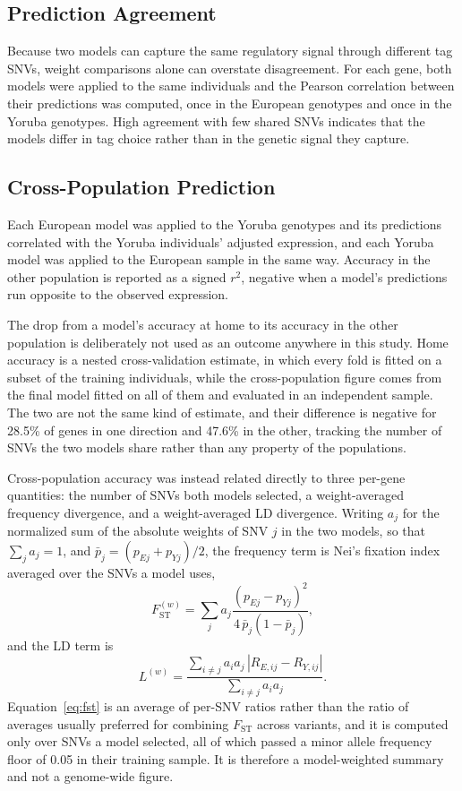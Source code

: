 \documentclass[conference]{IEEEtran}
\begin{document}
\subsection{Prediction Agreement}
Because two models can capture the same regulatory signal through different tag SNVs, weight comparisons alone can overstate disagreement. For each gene, both models were applied to the same individuals and the Pearson correlation between their predictions was computed, once in the European genotypes and once in the Yoruba genotypes. High agreement with few shared SNVs indicates that the models differ in tag choice rather than in the genetic signal they capture.

\subsection{Cross-Population Prediction}
Each European model was applied to the Yoruba genotypes and its predictions correlated with the Yoruba individuals' adjusted expression, and each Yoruba model was applied to the European sample in the same way. Accuracy in the other population is reported as a signed $r^2$, negative when a model's predictions run opposite to the observed expression.

The drop from a model's accuracy at home to its accuracy in the other population is deliberately not used as an outcome anywhere in this study. Home accuracy is a nested cross-validation estimate, in which every fold is fitted on a subset of the training individuals, while the cross-population figure comes from the final model fitted on all of them and evaluated in an independent sample. The two are not the same kind of estimate, and their difference is negative for 28.5\% of genes in one direction and 47.6\% in the other, tracking the number of SNVs the two models share rather than any property of the populations.

Cross-population accuracy was instead related directly to three per-gene quantities: the number of SNVs both models selected, a weight-averaged frequency divergence, and a weight-averaged LD divergence. Writing $a_j$ for the normalized sum of the absolute weights of SNV $j$ in the two models, so that $\sum_j a_j = 1$, and $\bar{p}_j = (p_{Ej} + p_{Yj})/2$, the frequency term is Nei's fixation index averaged over the SNVs a model uses,
\begin{equation}
F_{\mathrm{ST}}^{(w)} = \sum_j a_j \frac{(p_{Ej} - p_{Yj})^2}{4\,\bar{p}_j (1 - \bar{p}_j)},
\label{eq:fst}
\end{equation}
and the LD term is
\begin{equation}
L^{(w)} = \frac{\sum_{i \neq j} a_i a_j \, |R_{E,ij} - R_{Y,ij}|}{\sum_{i \neq j} a_i a_j}.
\label{eq:lddiv}
\end{equation}
Equation~\eqref{eq:fst} is an average of per-SNV ratios rather than the ratio of averages usually preferred for combining $F_{\mathrm{ST}}$ across variants, and it is computed only over SNVs a model selected, all of which passed a minor allele frequency floor of 0.05 in their training sample. It is therefore a model-weighted summary and not a genome-wide figure.
\end{document}
